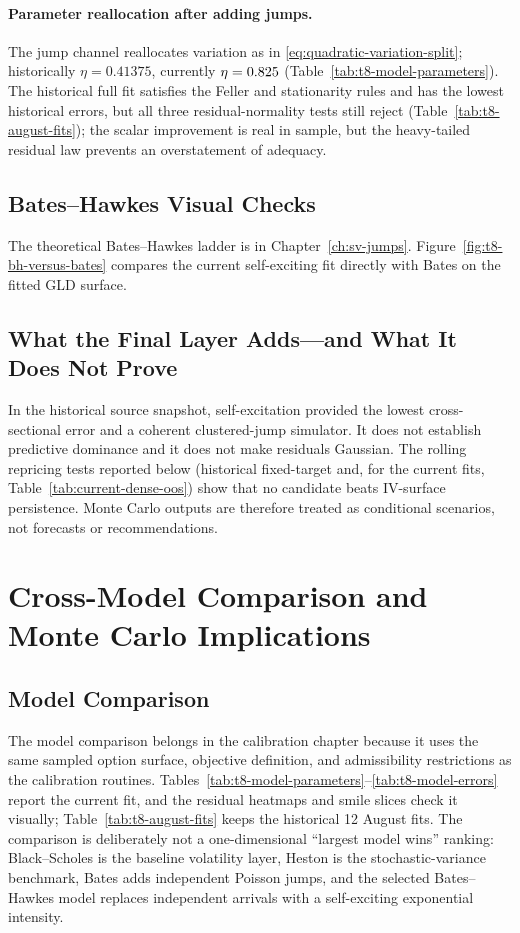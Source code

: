 \paragraph{Parameter reallocation after adding jumps.}
The jump channel reallocates variation as in \eqref{eq:quadratic-variation-split}; historically \(\eta=0.41375\), currently \(\eta=0.825\) (Table~\ref{tab:t8-model-parameters}). The historical full fit satisfies the Feller and stationarity rules and has the lowest historical errors, but all three residual-normality tests still reject (Table~\ref{tab:t8-august-fits}); the scalar improvement is real in sample, but the heavy-tailed residual law prevents an overstatement of adequacy.


\subsection{Bates--Hawkes Visual Checks}

The theoretical Bates--Hawkes ladder is in Chapter~\ref{ch:sv-jumps}. Figure~\ref{fig:t8-bh-versus-bates} compares the current self-exciting fit directly with Bates on the fitted GLD surface.


\subsection{What the Final Layer Adds---and What It Does Not Prove}

In the historical source snapshot, self-excitation provided the lowest cross-sectional error and a coherent clustered-jump simulator. It does not establish predictive dominance and it does not make residuals Gaussian. The rolling repricing tests reported below (historical fixed-target and, for the current fits, Table~\ref{tab:current-dense-oos}) show that no candidate beats IV-surface persistence. Monte Carlo outputs are therefore treated as conditional scenarios, not forecasts or recommendations.

\section{Cross-Model Comparison and Monte Carlo Implications}
\subsection{Model Comparison}

The model comparison belongs in the calibration chapter because it uses the same sampled option surface, objective definition, and admissibility restrictions as the calibration routines. Tables~\ref{tab:t8-model-parameters}--\ref{tab:t8-model-errors} report the current fit, and the residual heatmaps and smile slices check it visually; Table~\ref{tab:t8-august-fits} keeps the historical 12 August fits. The comparison is deliberately not a one-dimensional ``largest model wins'' ranking: Black--Scholes is the baseline volatility layer, Heston is the stochastic-variance benchmark, Bates adds independent Poisson jumps, and the selected Bates--Hawkes model replaces independent arrivals with a self-exciting exponential intensity.


